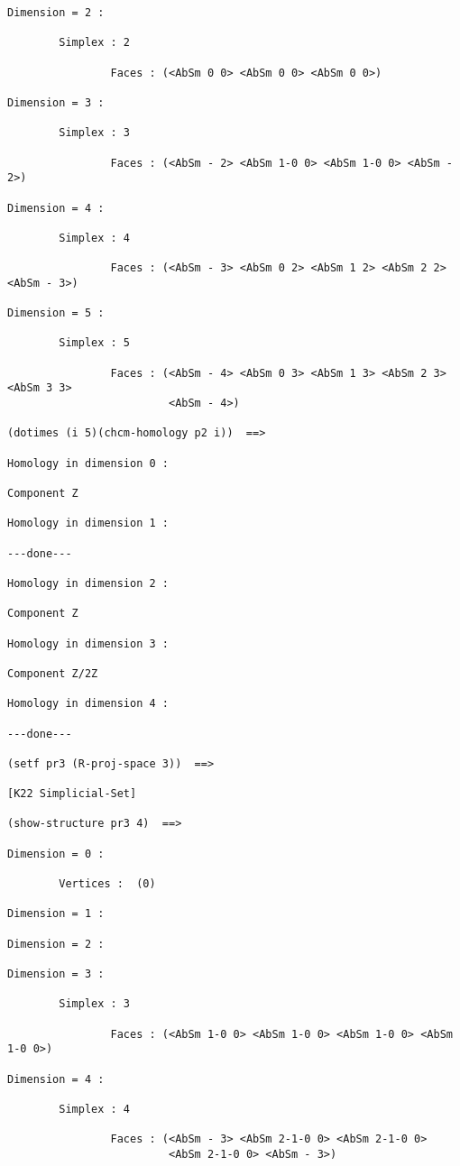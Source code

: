 {{\begin{verbatim}
Dimension = 2 :

        Simplex : 2

                Faces : (<AbSm 0 0> <AbSm 0 0> <AbSm 0 0>)

Dimension = 3 :

        Simplex : 3

                Faces : (<AbSm - 2> <AbSm 1-0 0> <AbSm 1-0 0> <AbSm - 2>)

Dimension = 4 :

        Simplex : 4

                Faces : (<AbSm - 3> <AbSm 0 2> <AbSm 1 2> <AbSm 2 2> <AbSm - 3>)

Dimension = 5 :

        Simplex : 5

                Faces : (<AbSm - 4> <AbSm 0 3> <AbSm 1 3> <AbSm 2 3> <AbSm 3 3>
                         <AbSm - 4>)

(dotimes (i 5)(chcm-homology p2 i))  ==>

Homology in dimension 0 :

Component Z

Homology in dimension 1 :

---done---

Homology in dimension 2 :

Component Z

Homology in dimension 3 :

Component Z/2Z

Homology in dimension 4 :

---done---

(setf pr3 (R-proj-space 3))  ==>

[K22 Simplicial-Set]

(show-structure pr3 4)  ==>

Dimension = 0 :

        Vertices :  (0)

Dimension = 1 :

Dimension = 2 :

Dimension = 3 :

        Simplex : 3

                Faces : (<AbSm 1-0 0> <AbSm 1-0 0> <AbSm 1-0 0> <AbSm 1-0 0>)

Dimension = 4 :

        Simplex : 4

                Faces : (<AbSm - 3> <AbSm 2-1-0 0> <AbSm 2-1-0 0>
                         <AbSm 2-1-0 0> <AbSm - 3>)


\end{verbatim}}}
